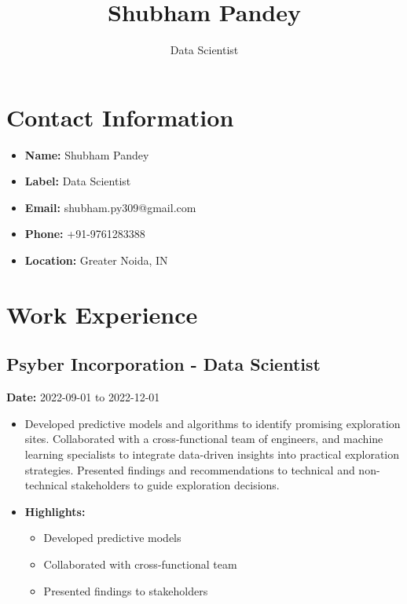 \documentclass{article}
\begin{document}
\title{Shubham Pandey}
\author{Data Scientist}
\date{}
\maketitle

\section{Contact Information}
\begin{itemize}[label=]
\item \textbf{Name:} Shubham Pandey
\item \textbf{Label:} Data Scientist
\item \textbf{Email:} shubham.py309@gmail.com
\item \textbf{Phone:} +91-9761283388
\item \textbf{Location:} Greater Noida, IN
\end{itemize}

\section{Work Experience}
\subsection{Psyber Incorporation - Data Scientist}
\textbf{Date:} 2022-09-01 to 2022-12-01
\begin{itemize}[label=-]
\item Developed predictive models and algorithms to identify promising exploration sites. Collaborated with a cross-functional team of engineers, and machine learning specialists to integrate data-driven insights into practical exploration strategies. Presented findings and recommendations to technical and non-technical stakeholders to guide exploration decisions.
\item \textbf{Highlights:}
\begin{itemize}[label=--]
\item Developed predictive models
\item Collaborated with cross-functional team
\item Presented findings to stakeholders
\end{itemize}
\end{itemize}
\end{document}
